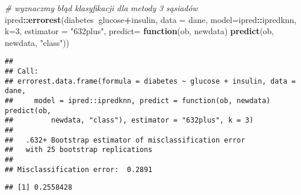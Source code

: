 \documentclass[polish,]{book}
\newenvironment{Shaded}{\begin{snugshade}}{\end{snugshade}}
\newcommand{\CommentTok}[1]{\textcolor[rgb]{0.56,0.35,0.01}{\textit{#1}}}
\newcommand{\ControlFlowTok}[1]{\textcolor[rgb]{0.13,0.29,0.53}{\textbf{#1}}}
\newcommand{\DataTypeTok}[1]{\textcolor[rgb]{0.13,0.29,0.53}{#1}}
\newcommand{\DecValTok}[1]{\textcolor[rgb]{0.00,0.00,0.81}{#1}}
\newcommand{\KeywordTok}[1]{\textcolor[rgb]{0.13,0.29,0.53}{\textbf{#1}}}
\newcommand{\NormalTok}[1]{#1}
\newcommand{\OperatorTok}[1]{\textcolor[rgb]{0.81,0.36,0.00}{\textbf{#1}}}
\newcommand{\StringTok}[1]{\textcolor[rgb]{0.31,0.60,0.02}{#1}}
\begin{document}
\begin{Shaded}
\begin{Highlighting}[]
\CommentTok{# wyznaczmy błąd klasyfikacji dla metody 3 sąsiadów}
\NormalTok{ipred}\OperatorTok{::}\KeywordTok{errorest}\NormalTok{(diabetes}\OperatorTok{~}\NormalTok{glucose}\OperatorTok{+}\NormalTok{insulin, }\DataTypeTok{data =}\NormalTok{ dane, }\DataTypeTok{model=}\NormalTok{ipred}\OperatorTok{::}\NormalTok{ipredknn, }\DataTypeTok{k=}\DecValTok{3}\NormalTok{,}
                \DataTypeTok{estimator =} \StringTok{"632plus"}\NormalTok{,}
                \DataTypeTok{predict=} \ControlFlowTok{function}\NormalTok{(ob, newdata) }\KeywordTok{predict}\NormalTok{(ob, newdata, }\StringTok{"class"}\NormalTok{))}
\end{Highlighting}
\end{Shaded}

\begin{verbatim}
## 
## Call:
## errorest.data.frame(formula = diabetes ~ glucose + insulin, data = dane, 
##     model = ipred::ipredknn, predict = function(ob, newdata) predict(ob, 
##         newdata, "class"), estimator = "632plus", k = 3)
## 
##   .632+ Bootstrap estimator of misclassification error 
##   with 25 bootstrap replications
## 
## Misclassification error:  0.2891
\end{verbatim}

\begin{Shaded}
\end{Shaded}

\begin{verbatim}
## [1] 0.2558428
\end{verbatim}
\end{document}
